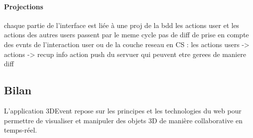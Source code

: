 \paragraph{Projections}
chaque partie de l’interface est liée à une proj de la bdd
les actions user et les actions des autres users passent par le meme cycle
pas de diff de prise en compte des evnts de l’interaction user ou de la couche 
reseau
en CS : les actions users -> actions -> recup info
action push du servuer qui peuvent etre gerees de maniere diff
\subsection{Bilan}

 L'application 3DEvent repose sur les principes et les 
technologies du web pour permettre de visualiser et manipuler des objets \gls{3D} 
de 
manière 
collaborative en temps-réel.